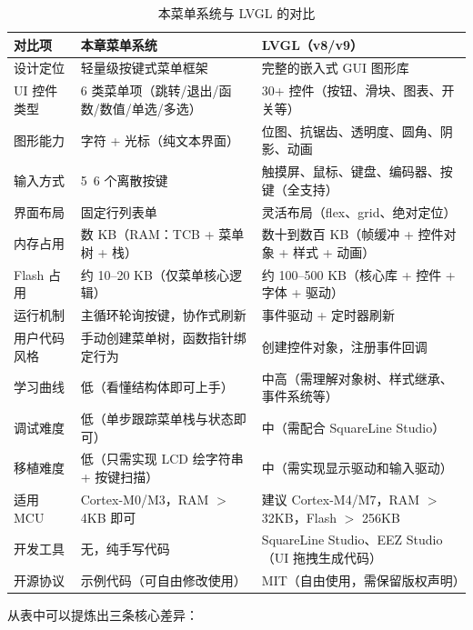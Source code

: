 \begin{table}[htbp]
	\centering
	\small
	\caption{本菜单系统与 LVGL 的对比}
	\label{tab:menu-vs-lvgl}
	\begin{tabularx}{\textwidth}{l X X}
		\toprule
		对比项 & 本章菜单系统 & LVGL（v8/v9） \\
		\midrule
		设计定位 & 轻量级按键式菜单框架 & 完整的嵌入式 GUI 图形库 \\
		UI 控件类型 & 6 类菜单项（跳转/退出/函数/数值/单选/多选） & 30+ 控件（按钮、滑块、图表、开关等） \\
		图形能力 & 字符 + 光标（纯文本界面） & 位图、抗锯齿、透明度、圆角、阴影、动画 \\
		输入方式 & 5~6 个离散按键 & 触摸屏、鼠标、键盘、编码器、按键（全支持） \\
		界面布局 & 固定行列表单 & 灵活布局（flex、grid、绝对定位） \\
		内存占用 & 数 KB（RAM：TCB + 菜单树 + 栈） & 数十到数百 KB（帧缓冲 + 控件对象 + 样式 + 动画） \\
		Flash 占用 & 约 10--20 KB（仅菜单核心逻辑） & 约 100--500 KB（核心库 + 控件 + 字体 + 驱动） \\
		运行机制 & 主循环轮询按键，协作式刷新 & 事件驱动 + 定时器刷新 \\
		用户代码风格 & 手动创建菜单树，函数指针绑定行为 & 创建控件对象，注册事件回调 \\
		学习曲线 & 低（看懂结构体即可上手） & 中高（需理解对象树、样式继承、事件系统等） \\
		调试难度 & 低（单步跟踪菜单栈与状态即可） & 中（需配合 SquareLine Studio） \\
		移植难度 & 低（只需实现 LCD 绘字符串 + 按键扫描） & 中（需实现显示驱动和输入驱动） \\
		适用 MCU & Cortex-M0/M3，RAM $>$ 4KB 即可 & 建议 Cortex-M4/M7，RAM $>$ 32KB，Flash $>$ 256KB \\
		开发工具 & 无，纯手写代码 & SquareLine Studio、EEZ Studio（UI 拖拽生成代码） \\
		开源协议 & 示例代码（可自由修改使用） & MIT（自由使用，需保留版权声明） \\
		\bottomrule
	\end{tabularx}
\end{table}

从表中可以提炼出三条核心差异：

